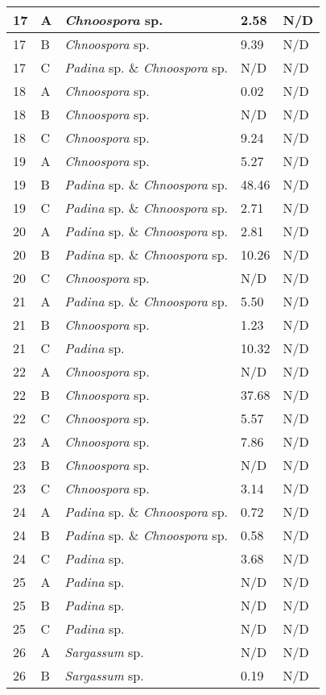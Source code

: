\documentclass[12pt]{article}
\begin{document}
\begin{longtable}{ | p{2cm} | p{2cm} | p{3cm} | p{3.5cm} | p{3.5cm} | }
\hline
17&A&\emph{Chnoospora} sp.&2.58
&N/D\\
\hline
17&B&\emph{Chnoospora} sp.&9.39
&N/D\\
\hline
17&C&\emph{Padina} sp. \& \emph{Chnoospora} sp.&N/D&N/D\\
\hline
18&A&\emph{Chnoospora }sp.&0.02
&N/D\\
\hline
18&B&\emph{Chnoospora} sp.&N/D&N/D\\
\hline
18&C&\emph{Chnoospora }sp.&9.24
&N/D\\
\hline
19&A&\emph{Chnoospora }sp.&5.27
&N/D\\
\hline
19&B&\emph{Padina} sp. \& \emph{Chnoospora} sp.&48.46
&N/D\\
\hline
19&C&\emph{Padina} sp. \& \emph{Chnoospora }sp.&2.71
&N/D\\
\hline
20&A&\emph{Padina} sp. \& \emph{Chnoospora }sp.&2.81
&N/D\\
\hline
20&B&\emph{Padina} sp. \& \emph{Chnoospora }sp.&10.26
&N/D\\
\hline
20&C&\emph{Chnoospora }sp.&N/D&N/D\\
\hline
21&A&\emph{Padina} sp. \& \emph{Chnoospora} sp.&5.50
&N/D\\
\hline
21&B&\emph{Chnoospora }sp.&1.23
&N/D\\
\hline
21&C&\emph{Padina} sp.&10.32
&N/D\\
\hline
22&A&\emph{Chnoospora }sp.&N/D&N/D\\
\hline
22&B&\emph{Chnoospora} sp.&37.68
&N/D\\
\hline
22&C&\emph{Chnoospora} sp.&5.57
&N/D\\
\hline
23&A&\emph{Chnoospora }sp.&7.86
&N/D\\
\hline
23&B&\emph{Chnoospora} sp.&N/D&N/D\\
\hline
23&C&\emph{Chnoospora }sp.&3.14
&N/D\\
\hline
24&A&\emph{Padina} sp. \& \emph{Chnoospora }sp.&0.72
&N/D\\
\hline
24&B&\emph{Padina} sp. \& \emph{Chnoospora} sp.&0.58
&N/D\\
\hline
24&C&\emph{Padina} sp.&3.68
&N/D\\
\hline
25&A&\emph{Padina} sp.&N/D&N/D\\
\hline
25&B&\emph{Padina} sp.&N/D&N/D\\
\hline
25&C&\emph{Padina} sp.&N/D&N/D\\
\hline
26
&A&\emph{Sargassum} sp.&N/D&N/D\\
\hline
26
&B&\emph{Sargassum} sp.&0.19&N/D\\

\end{longtable}
\end{document}

